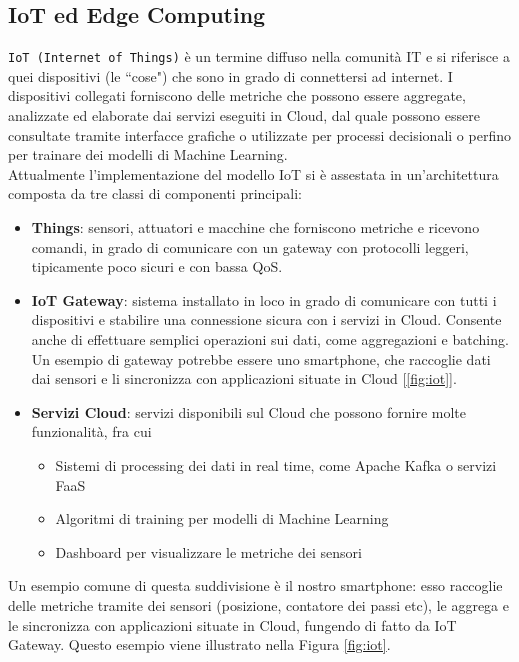 \subsection{IoT ed Edge Computing}

\texttt{IoT (Internet of Things)}\cite{Laghari2021A} è un termine diffuso nella comunità IT e si riferisce a quei dispositivi (le ``cose") che sono in grado di connettersi ad internet. I dispositivi collegati forniscono delle metriche che possono essere aggregate, analizzate ed elaborate dai servizi eseguiti in Cloud, dal quale possono essere consultate tramite interfacce grafiche o utilizzate per processi decisionali o perfino per trainare dei modelli di Machine Learning.\\
Attualmente l'implementazione del modello IoT si è assestata in un'architettura composta da tre classi di componenti principali\cite{Sultana2020IoT}:
\begin{itemize}
    \item \textbf{Things}: sensori, attuatori e macchine che forniscono metriche e ricevono comandi, in grado di comunicare con un gateway con protocolli leggeri, tipicamente poco sicuri e con bassa QoS.
    \item \textbf{IoT Gateway}: sistema installato in loco in grado di comunicare con tutti i dispositivi e stabilire una connessione sicura con i servizi in Cloud. Consente anche di effettuare semplici operazioni sui dati, come aggregazioni e batching. Un esempio di gateway potrebbe essere uno smartphone, che raccoglie dati dai sensori e li sincronizza con applicazioni situate in Cloud [\ref{fig:iot}].
    \item \textbf{Servizi Cloud}: servizi disponibili sul Cloud che possono fornire molte funzionalità, fra cui
    \begin{itemize}
        \item Sistemi di processing dei dati in real time, come Apache Kafka o servizi FaaS
        \item Algoritmi di training per modelli di Machine Learning
        \item Dashboard per visualizzare le metriche dei sensori
    \end{itemize}
\end{itemize}

Un esempio comune di questa suddivisione è il nostro smartphone: esso raccoglie delle metriche tramite dei sensori (posizione, contatore dei passi etc), le aggrega e le sincronizza con applicazioni situate in Cloud, fungendo di fatto da IoT Gateway. Questo esempio viene illustrato nella Figura \ref{fig:iot}.

